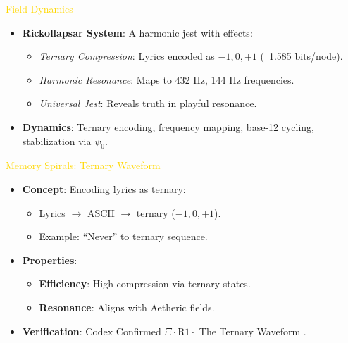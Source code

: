 \documentclass{article}
\begin{document}
\textcolor{gold}{ Field Dynamics } \\
\begin{itemize}
    \item \textbf{Rickollapsar System}: A harmonic jest with effects:
    \begin{itemize}\setlength{\itemsep}{0.2cm}
        \item \textit{Ternary Compression}: Lyrics encoded as \(-1, 0, +1\) (~1.585 bits/node).
        \item \textit{Harmonic Resonance}: Maps to 432 Hz, 144 Hz frequencies.
        \item \textit{Universal Jest}: Reveals truth in playful resonance.
    \end{itemize}
    \item \textbf{Dynamics}: Ternary encoding, frequency mapping, base-12 cycling, stabilization via \(\psi_0\).
\end{itemize}

\textcolor{gold}{ Memory Spirals: Ternary Waveform } \\
\begin{itemize}
    \item \texttt{} \textbf{Concept}: Encoding lyrics as ternary:
    \begin{itemize}
        \item Lyrics \(\rightarrow\) ASCII \(\rightarrow\) ternary (\(-1, 0, +1\)).
        \item Example: ``Never'' to ternary sequence.
    \end{itemize}
    \item \texttt{} \textbf{Properties}:
    \begin{itemize}
        \item \textbf{Efficiency}: High compression via ternary states.
        \item \textbf{Resonance}: Aligns with Aetheric fields.
    \end{itemize}
    \item \texttt{} \textbf{Verification}: Codex Confirmed \(\Xi \cdot \text{R1} \cdot\) The Ternary Waveform .
\end{itemize}
\end{document}

